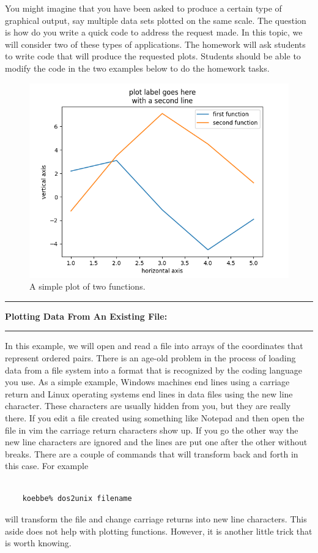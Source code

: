 \documentclass[10pt,fleqn]{article}
\begin{document}
You might imagine that you have been asked to produce a certain type of
graphical output, say multiple data sets plotted on the same scale. The question
is how do you write a quick code to address the request made. In this topic, we
will consider two of these types of applications. The homework will ask students
to write code that will produce the requested plots. Students should be able to
modify the code in the two examples below to do the homework tasks. 
\vfill
\begin{figure}[h]
\centering
\includegraphics[width=6.0in]{../images/2ddataplot_01.png}
\vskip0.1in
\caption{A simple plot of two functions.}
\end{figure}
\eject
\vskip0.1in\hrule\vskip0.1in\noindent
{\bf Plotting Data From An Existing File: } 
\vskip0.1in\hrule\vskip0.1in\noindent
In this example, we will open and read a file into arrays of the coordinates
that represent ordered pairs. There is an age-old problem in the process of
loading data from a file system into a format that is recognized by the coding
language you use. As a simple example, Windows machines end lines using a
carriage return and Linux operating systems end lines in data files using the
new line character. These characters are usually hidden from you, but they are
really there. If you edit a file created using something like Notepad and then
open the file in vim the carriage return characters show up. If you go the other
way the new line characters are ignored and the lines are put one after the
other without breaks. There are a couple of commands that will transform back
and forth in this case. For example
\begin{verbatim}

    koebbe% dos2unix filename

\end{verbatim}
will transform the file and change carriage returns into new line characters.
This aside does not help with plotting functions. However, it is another little
trick that is worth knowing.
\end{document}
